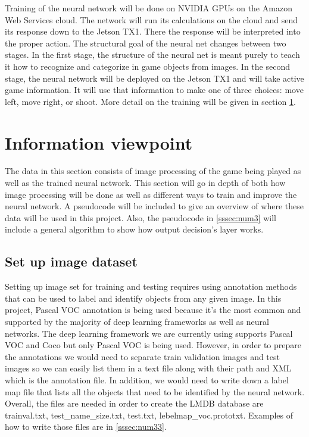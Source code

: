 \documentclass[onecolumn, draftclsnofoot,10pt, compsoc]{IEEEtran}
\begin{document}
\newline
\newline
Training of the neural network will be done on NVIDIA GPUs on the Amazon Web Services cloud.
The network will run its calculations on the cloud and send its response down to the Jetson TX1.
There the response will be interpreted into the proper action.
\newline
\newline
The structural goal of the neural net changes between two stages.
In the first stage, the structure of the neural net is meant purely to teach it how to recognize and categorize in game objects from images.
In the second stage, the neural network will be deployed on the Jetson TX1 and will take active game information.
It will use that information to make one of three choices: move left, move right, or shoot.
More detail on the training will be given in section \ref{sssec:num2}.

\section{Information viewpoint}\label{sssec:num2}%

The data in this section consists of image processing of the game being played as well as the trained neural network.
This section will go in depth of both how image processing will be done as well as different ways to train and improve the neural network.
A pseudocode will be included to give an overview of where these data will be used in this project.
Also, the pseudocode in \ref{sssec:num3} will include a general algorithm to show how output decision's layer works.

\subsection{Set up image dataset}%

Setting up image set for training and testing requires using annotation methods that can be used to label and identify objects from any given image.
In this project, Pascal VOC annotation is being used because it's the most common and supported by the majority of deep learning frameworks as well as neural networks.
The deep learning framework we are currently using supports Pascal VOC and Coco but only Pascal VOC is being used.
However, in order to prepare the annotations we would need to separate train validation images and test images so we can easily list them in a text file along with their path and XML which is the annotation file.
In addition, we would need to write down a label map file that lists all the objects that need to be identified by the neural network.
Overall, the files are needed in order to create the LMDB database are trainval.txt, test_name_size.txt, test.txt, lebelmap_voc.prototxt.
Examples of how to write those files are in \ref{sssec:num33}.
\end{document}
